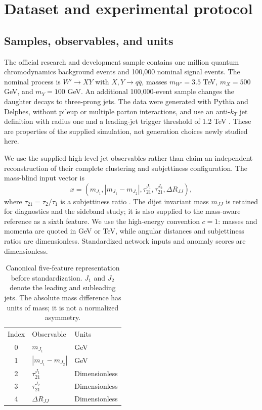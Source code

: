 \documentclass[reprint,aps,pra,amsmath,amssymb,floatfix,raggedbottom]{revtex4-2}
\newcommand{\mjj}{m_{JJ}}
\begin{document}
\section{Dataset and experimental protocol}
\subsection{Samples, observables, and units}
The official research and development sample contains one million quantum chromodynamics background events and 100,000 nominal signal events. The nominal process is $W'\to XY$ with $X,Y\to q\bar q$, masses $m_{W'}=3.5$ TeV, $m_X=500$ GeV, and $m_Y=100$ GeV. An additional 100,000-event sample changes the daughter decays to three-prong jets. The data were generated with Pythia and Delphes, without pileup or multiple parton interactions, and use an anti-$k_T$ jet definition with radius one and a leading-jet trigger threshold of 1.2 TeV \cite{dataset,lhco}. These are properties of the supplied simulation, not generation choices newly studied here.

We use the supplied high-level jet observables rather than claim an independent reconstruction of their complete clustering and subjettiness configuration. The mass-blind input vector is
\begin{equation}
 x=(m_{J_1},|m_{J_1}-m_{J_2}|,\tau_{21}^{J_1},\tau_{21}^{J_2},\Delta R_{JJ}),
\end{equation}
where $\tau_{21}=\tau_2/\tau_1$ is a subjettiness ratio \cite{tau}. The dijet invariant mass $\mjj$ is retained for diagnostics and the sideband study; it is also supplied to the mass-aware reference as a sixth feature. We use the high-energy convention $c=1$: masses and momenta are quoted in GeV or TeV, while angular distances and subjettiness ratios are dimensionless. Standardized network inputs and anomaly scores are dimensionless.

\begin{table}[tbp]
\caption{Canonical five-feature representation before standardization. $J_1$ and $J_2$ denote the leading and subleading jets. The absolute mass difference has units of mass; it is not a normalized asymmetry.}\label{tab:features}
\begin{ruledtabular}\begin{tabular}{cll}
Index & Observable & Units\\
0 & $m_{J_1}$ & GeV\\
1 & $|m_{J_1}-m_{J_2}|$ & GeV\\
2 & $\tau_{21}^{J_1}$ & Dimensionless\\
3 & $\tau_{21}^{J_2}$ & Dimensionless\\
4 & $\Delta R_{JJ}$ & Dimensionless
\end{tabular}\end{ruledtabular}
\end{table}
\end{document}
